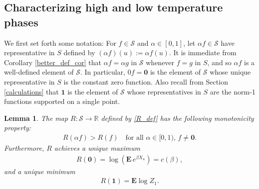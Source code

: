 \documentclass[11pt,reqno]{amsart}
\numberwithin{equation}{section}
\newtheorem{lemma}[thm]{Lemma}
\theoremstyle{definition}
\begin{document}
\subsection{Characterizing high and low temperature phases} \label{norm_monotonicity}
We first set forth some notation: For $f \in {\mathcal{S}}$ and $\alpha \in [0,1]$, let $\alpha f \in {\mathcal{S}}$ have representative in $S$ defined by $(\alpha f)(u) := \alpha f(u)$.
It is immediate from Corollary \ref{better_def_cor} that $\alpha f = \alpha g$ in ${\mathcal{S}}$ whenever $f = g$ in $S$, and so $\alpha f$ is a well-defined element of ${\mathcal{S}}$.
In particular, $0f = {{\boldsymbol {0}}}$ is the element of ${\mathcal{S}}$ whose unique representative in $S$ is the constant zero function.
Also recall from Section \ref{calculations} that ${{\boldsymbol {1}}}$ is the element of ${\mathcal{S}}$ whose representatives in $S$ are the norm-1 functions supported on a single point.

\begin{lemma} \label{unique_max}
The map $R : {\mathcal{S}} \to {\mathbb{R}}$ defined by \eqref{R_def} has the following monotonicity property:
{\begin{align*} {
R(\alpha f) > R(f) \quad \text{for all $\alpha \in [0,1)$, $f \neq {{\boldsymbol {0}}}$.}
} \end{align*}}
Furthermore, $R$ achieves a unique maximum 
{\begin{align*} {
R({{\boldsymbol {0}}}) = \log({\mathbf{E}}\, e^{\beta X_u}) = c(\beta),
} \end{align*}}
and a unique minimum 
{\begin{align*} {
R({{\boldsymbol {1}}}) = {\mathbf{E}}\log Z_1.
} \end{align*}}
\end{lemma}
\end{document}
